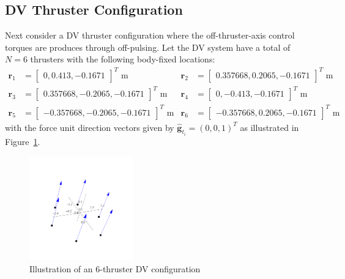 \documentclass[]{BasiliskReportMemo}
\begin{document}
\subsection{DV Thruster Configuration}
Next consider a DV thruster configuration where the off-thruster-axis control torques are produces through off-pulsing.  Let the DV system have a total of $N = 6$ thrusters with the following body-fixed locations:
\begin{align*}
	\label{eq:th:loc}
	\bm r_{1} &= \begin{bmatrix} 0, 0.413, -0.1671  \end{bmatrix}^{T} \text{ m}
	& 
	\bm r_{2} &= \begin{bmatrix} 0.357668, 0.2065, -0.1671  \end{bmatrix}^{T} \text{ m}
	\\
	\bm r_{3} &= \begin{bmatrix} 0.357668, -0.2065, -0.1671 \end{bmatrix}^{T}	 \text{ m}
	&
	\bm r_{4} &= \begin{bmatrix} 0, -0.413, -0.1671  \end{bmatrix}^{T} \text{ m}
	\\
	\bm r_{5} &= \begin{bmatrix} -0.357668, -0.2065, -0.1671  \end{bmatrix}^{T}	 \text{ m}
	&
	\bm r_{6} &= \begin{bmatrix} -0.357668, 0.2065, -0.1671 \end{bmatrix}^{T} \text{ m}
\end{align*}
with the force unit direction vectors given by $\hat{\bm g}_{t_{i}} = (0,0,1)^{T}$ as illustrated in Figure~\ref{fig:6ThrConfig}.
\begin{figure}[t]
	\centerline{
	\includegraphics[width=0.4\textwidth]{Figures/dvThrConfig}
	}
	\caption{Illustration of an 6-thruster DV configuration}
	\label{fig:6ThrConfig}
\end{figure}
\end{document}
